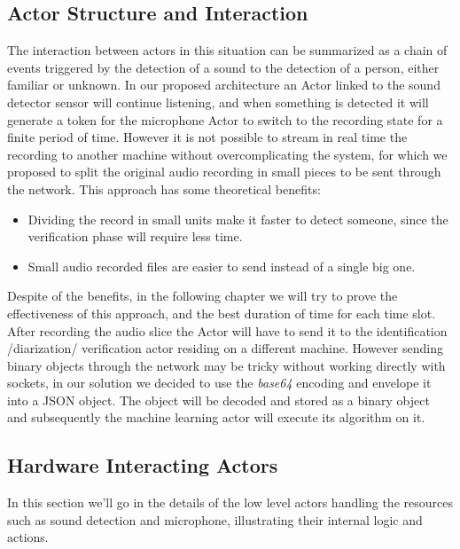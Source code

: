 \subsection{Actor Structure and Interaction}

The interaction between actors in this situation can be summarized as a chain
of events triggered by the detection of a sound to the detection of a person, either
familiar or unknown. In our proposed architecture an Actor linked to the sound detector sensor
will continue listening, and when something is detected it will generate a token for the microphone Actor
to switch to the recording state for a finite period of time. However it is not possible to stream in real time the recording
to another machine without overcomplicating the system, for which we proposed to split the original
audio recording in small pieces to be sent through the network. This approach has some theoretical benefits:

\begin{itemize}
    \item Dividing the record in small units make it faster to detect someone, since the
    verification phase will require less time.
    \item Small audio recorded files are easier to send instead of a single big one.
\end{itemize}

Despite of the benefits, in the following chapter we will try to prove the effectiveness of this approach,
and the best duration of time for each time slot.\newline
After recording the audio slice the Actor will have to send it to the identification /diarization/ verification
actor residing on a different machine. However sending binary objects through the network
may be tricky without working directly with sockets, in our solution we decided to
use the \textit{base64} encoding and envelope it into a JSON object. The object will be decoded
and stored as a binary object and subsequently the machine learning actor will execute
its algorithm on it.

\subsection{Hardware Interacting Actors}

In this section we'll go in the details of the low level actors handling the resources
such as sound detection and microphone, illustrating their internal logic and actions.

